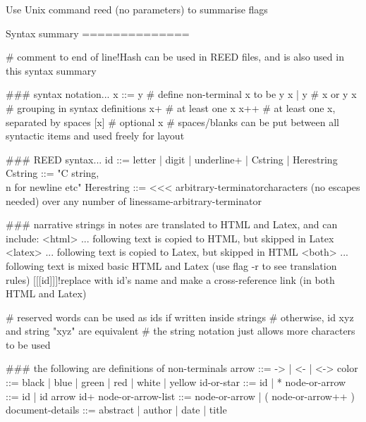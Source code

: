 Use Unix command reed (no parameters) to summarise flags

Syntax summary
==============

# comment to end of line!Hash can be used in REED files, and is also used in this syntax summary

### syntax notation...
x ::= y # define non-terminal x to be y
x | y   # x or y
{x}     # grouping in syntax definitions
x+      # at least one x
x++     # at least one x, separated by spaces
[x]     # optional x
        # spaces/blanks can be put between all syntactic items and used freely for layout 

### REED syntax...
id ::= {letter | digit | underline}+ | Cstring | Herestring
Cstring ::= "C string, \\n for newline etc" 
Herestring ::= <<< arbitrary-terminator\n                           characters (no escapes needed) over any number of lines\n                       same-arbitrary-terminator

### narrative strings in notes are translated to HTML and Latex, and can include:
<html> ...  following text is copied to HTML, but skipped in Latex
<latex> ... following text is copied to Latex, but skipped in HTML
<both> ...  following text is mixed basic HTML and Latex (use flag -r to see translation rules)
[[[id]]]!replace with id's name and make a cross-reference link (in both HTML and Latex)

# reserved words can be used as ids if written inside strings
# otherwise, id xyz and string "xyz" are equivalent
# the string notation just allows more characters to be used

### the following are definitions of non-terminals
arrow ::= -> | <- | <->
color ::= black | blue | green | red | white | yellow
id-or-star ::= id | *
node-or-arrow ::= id | id {arrow id}+
node-or-arrow-list ::= node-or-arrow | ( node-or-arrow++ )
document-details ::= abstract | author | date | title

